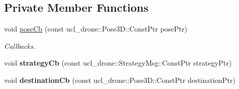 \subsection*{Private Member Functions}
\begin{DoxyCompactItemize}
\item 
\mbox{\label{classPathPlanning_a02f2a2a3324d4a8f24ec5ee11d746e7b}} 
void \hyperlink{classPathPlanning_a02f2a2a3324d4a8f24ec5ee11d746e7b}{pose\+Cb} (const ucl\+\_\+drone\+::\+Pose3\+D\+::\+Const\+Ptr pose\+Ptr)
\begin{DoxyCompactList}\small\item\em Callbacks. \end{DoxyCompactList}\item 
\mbox{\label{classPathPlanning_a119777174248b9df2e0545488e242c2a}} 
void {\bfseries strategy\+Cb} (const ucl\+\_\+drone\+::\+Strategy\+Msg\+::\+Const\+Ptr strategy\+Ptr)
\item 
\mbox{\label{classPathPlanning_ae53b9142cad8205127a1781bf892525c}} 
void {\bfseries destination\+Cb} (const ucl\+\_\+drone\+::\+Pose3\+D\+::\+Const\+Ptr destination\+Ptr)
\end{DoxyCompactItemize}
